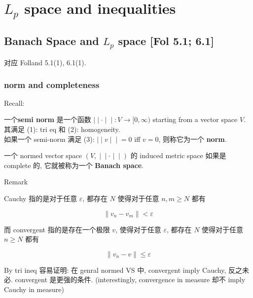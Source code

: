 \chapter{\texorpdfstring{\(L_{p}\) space and inequalities}{L\_\{p\} space and inequalities}}\label{l_p-space-and-inequalities}

\section{\texorpdfstring{Banach Space and \(L_{p}\) space {[}Fol 5.1; 6.1{]}}{Banach Space and L\_\{p\} space {[}Fol 5.1; 6.1{]}}}

对应 Folland 5.1(1), 6.1(1).

\subsection{norm and completeness}\label{norm-and-completeness}

Recall:

\begin{definition}{}

一个\textbf{semi norm} 是一个函数 \(\left. | \middle| \cdot \middle| \middle| :V\rightarrow\lbrack 0,\infty) \right.\) starting from a vector space \(V\). 其满足 (1): tri eq 和 (2): homogeneity.\\
如果一个 semi-norm 满足 (3): \(\left. | \middle| v \middle| \middle| = 0 \right.\) iff \(v = 0\), 则称它为一个 \textbf{norm}.

\end{definition}

\begin{definition}{}

一个 normed vector space \(\left. (V, \middle| \middle| \cdot \middle| \middle| ) \right.\) 的 induced metric space 如果是 complete 的, 它就被称为一个 \textbf{Banach space}.\\

\end{definition}

\begin{qlremark}{Remark}

Cauchy 指的是对于任意 \(\varepsilon\), 都存在 \(N\) 使得对于任意 \(n,m \geq N\) 都有

\[\parallel v_{n} - v_{m} \parallel < \varepsilon\]

而 convergent 指的是存在一个极限 \(v\), 使得对于任意 \(\varepsilon\), 都存在 \(N\) 使得对于任意 \(n \geq N\) 都有

\[\parallel v_{n} - v \parallel \leq \varepsilon\]

By tri ineq 容易证明: 在 genral normed VS 中, convergent imply Cauchy, 反之未必. convergent 是更强的条件. (interestingly, convergence in measure 却不 imply Cauchy in measure)

\end{qlremark}


